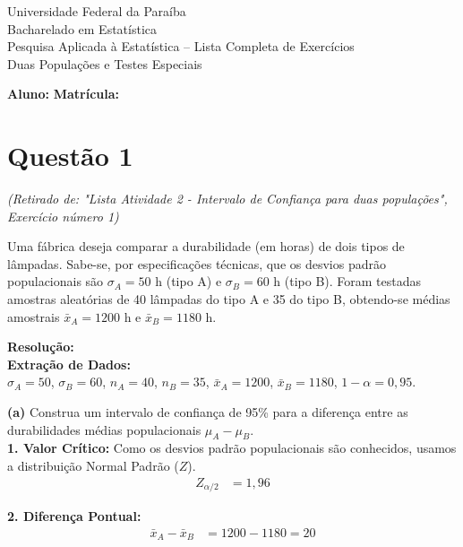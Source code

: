 \documentclass[12pt, a4paper]{article}
\begin{document}
\begin{center}
{\Large Universidade Federal da Paraíba}\\[6pt]
{\large Bacharelado em Estatística}\\[6pt]
{\large Pesquisa Aplicada à Estatística -- Lista Completa de Exercícios}\\[12pt]
{\large Duas Populações e Testes Especiais}\\[10pt]
\end{center}

\vspace{20pt}
\noindent\textbf{Aluno:} \hrulefill \hfill \textbf{Matrícula:} \hrulefill
\vspace{16pt}

\section*{Questão 1}
\textit{(Retirado de: "Lista Atividade 2 - Intervalo de Confiança para duas populações", Exercício número 1)}

Uma fábrica deseja comparar a durabilidade (em horas) de dois tipos de lâmpadas. Sabe-se, por especificações técnicas, que os desvios padrão populacionais são $\sigma_A = 50$ h (tipo A) e $\sigma_B = 60$ h (tipo B). Foram testadas amostras aleatórias de 40 lâmpadas do tipo A e 35 do tipo B, obtendo-se médias amostrais $\bar{x}_A = 1200$ h e $\bar{x}_B = 1180$ h.

\vspace{0.3cm}
\noindent\textbf{Resolução:}\\
\textbf{Extração de Dados:} \\
$\sigma_A = 50$, $\sigma_B = 60$, $n_A = 40$, $n_B = 35$, $\bar{x}_A = 1200$, $\bar{x}_B = 1180$, $1 - \alpha = 0,95$.

\medskip\noindent\textbf{(a)} Construa um intervalo de confiança de 95\% para a diferença entre as durabilidades médias populacionais $\mu_A - \mu_B$.\\
\noindent \textbf{1. Valor Crítico:} Como os desvios padrão populacionais são conhecidos, usamos a distribuição Normal Padrão ($Z$).
\begin{align*}
Z_{\alpha/2} &= \boxed{1,96}
\end{align*}

\noindent \textbf{2. Diferença Pontual:}
\begin{align*}
\bar{x}_A - \bar{x}_B &= 1200 - 1180 = \boxed{20}
\end{align*}
\end{document}
